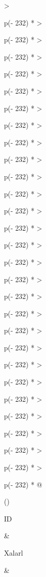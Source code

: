 \documentclass[
  letterpaper,
  DIV=11,
  numbers=noendperiod]{scrartcl}
\begin{document}
\begin{longtable}[]
{  >{\raggedright\arraybackslash}p{(\columnwidth - 232\tabcolsep) * }
  >{\raggedright\arraybackslash}p{(\columnwidth - 232\tabcolsep) * }
  >{\raggedright\arraybackslash}p{(\columnwidth - 232\tabcolsep) * }
  >{\raggedright\arraybackslash}p{(\columnwidth - 232\tabcolsep) * }
  >{\raggedright\arraybackslash}p{(\columnwidth - 232\tabcolsep) * }
  >{\raggedright\arraybackslash}p{(\columnwidth - 232\tabcolsep) * }
  >{\raggedright\arraybackslash}p{(\columnwidth - 232\tabcolsep) * }
  >{\raggedright\arraybackslash}p{(\columnwidth - 232\tabcolsep) * }
  >{\raggedright\arraybackslash}p{(\columnwidth - 232\tabcolsep) * }
  >{\raggedright\arraybackslash}p{(\columnwidth - 232\tabcolsep) * }
  >{\raggedright\arraybackslash}p{(\columnwidth - 232\tabcolsep) * }
  >{\raggedright\arraybackslash}p{(\columnwidth - 232\tabcolsep) * }
  >{\raggedright\arraybackslash}p{(\columnwidth - 232\tabcolsep) * }
  >{\raggedright\arraybackslash}p{(\columnwidth - 232\tabcolsep) * }
  >{\raggedright\arraybackslash}p{(\columnwidth - 232\tabcolsep) * }
  >{\raggedright\arraybackslash}p{(\columnwidth - 232\tabcolsep) * }
  >{\raggedright\arraybackslash}p{(\columnwidth - 232\tabcolsep) * }
  >{\raggedright\arraybackslash}p{(\columnwidth - 232\tabcolsep) * }
  >{\raggedright\arraybackslash}p{(\columnwidth - 232\tabcolsep) * }
  >{\raggedright\arraybackslash}p{(\columnwidth - 232\tabcolsep) * }
  >{\raggedright\arraybackslash}p{(\columnwidth - 232\tabcolsep) * }
  >{\raggedright\arraybackslash}p{(\columnwidth - 232\tabcolsep) * }
  >{\raggedright\arraybackslash}p{(\columnwidth - 232\tabcolsep) * }
  >{\raggedright\arraybackslash}p{(\columnwidth - 232\tabcolsep) * }
  >{\raggedright\arraybackslash}p{(\columnwidth - 232\tabcolsep) * }
  >{\raggedright\arraybackslash}p{(\columnwidth - 232\tabcolsep) * }
  >{\raggedright\arraybackslash}p{(\columnwidth - 232\tabcolsep) * }
  >{\raggedright\arraybackslash}p{(\columnwidth - 232\tabcolsep) * }@{}}
\toprule()
\begin{minipage}[b]{\linewidth}\raggedright
ID
\end{minipage} & \begin{minipage}[b]{\linewidth}\raggedright
Xalarl
\end{minipage} & \begin{minipage}[b]{\linewidth}\raggedright

\end{minipage}
\end{longtable}
\end{document}
